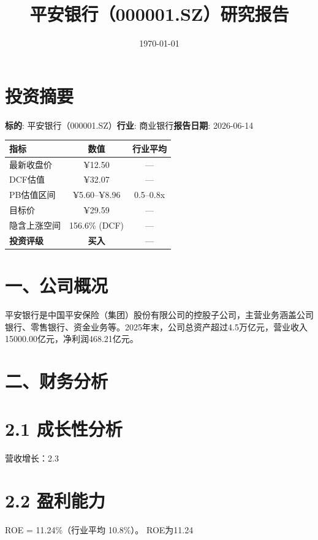 \documentclass[12pt,a4paper]{article}
\begin{document}
\title{平安银行（000001.SZ）研究报告}
\date{\today}
\maketitle
\begin{abstract}

\end{abstract}
\newpage
\section{投资摘要}
\textbf{标的}: 平安银行（000001.SZ）\hspace{1em}\textbf{行业}: 商业银行\hspace{1em}\textbf{报告日期}: 2026-06-14

\begin{tabular}{@{}lcc@{}}\hline
\textbf{指标} & \textbf{数值} & \textbf{行业平均} \\ \hline
最新收盘价 & ¥12.50 & — \\
DCF估值 & ¥32.07 & — \\
PB估值区间 & ¥5.60--¥8.96 & 0.5--0.8x \\
目标价 & ¥29.59 & — \\
隐含上涨空间 & 156.6\% (DCF) & — \\
\textbf{投资评级} & \textbf{买入} & — \\ \hline
\end{tabular}

\section{一、公司概况}
平安银行是中国平安保险（集团）股份有限公司的控股子公司，主营业务涵盖公司银行、零售银行、资金业务等。2025年末，公司总资产超过4.5万亿元，营业收入15000.00亿元，净利润468.21亿元。

\section{二、财务分析}


\section{2.1 成长性分析}
营收增长：2.3%

\section{2.2 盈利能力}
ROE = 11.24\%（行业平均 10.8\%）。 ROE为11.24%
\end{document}

